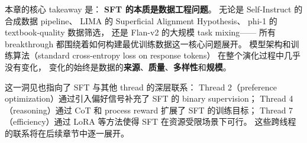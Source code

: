 \noindent
本章的核心 takeaway 是：
\textbf{SFT 的本质是数据工程问题}。
无论是 Self-Instruct 的合成数据 pipeline、
LIMA 的 Superficial Alignment Hypothesis、
phi-1 的 textbook-quality 数据筛选，
还是 Flan-v2 的大规模 task mixing——
所有 breakthrough 都围绕着如何构建最优训练数据这一核心问题展开。
模型架构和训练算法（standard cross-entropy loss on response tokens）
在整个演化过程中几乎没有变化，
变化的始终是数据的\textbf{来源}、\textbf{质量}、\textbf{多样性}和\textbf{规模}。

这一洞见也指向了 SFT 与其他 thread 的深层联系：
Thread 2（preference optimization）通过引入偏好信号补充了 SFT 的 binary supervision；
Thread 4（reasoning）通过 CoT 和 process reward 扩展了 SFT 的训练目标；
Thread 7（efficiency）通过 LoRA 等方法使得 SFT 在资源受限场景下可行。
这些跨线程的联系将在后续章节中逐一展开。
